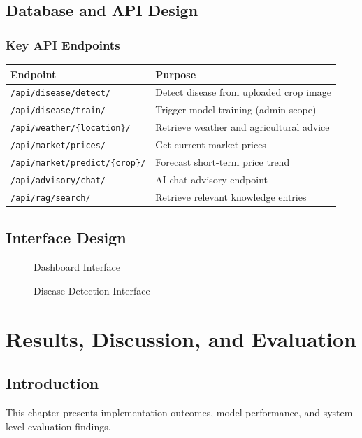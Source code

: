 \documentclass[12pt,a4paper]{report}
\begin{document}
\section{Database and API Design}
\subsection{Key API Endpoints}
\begin{longtable}{p{4.5cm} p{9.5cm}}
\toprule
\textbf{Endpoint} & \textbf{Purpose} \\
\midrule
\texttt{/api/disease/detect/} & Detect disease from uploaded crop image \\
\texttt{/api/disease/train/} & Trigger model training (admin scope) \\
\texttt{/api/weather/\{location\}/} & Retrieve weather and agricultural advice \\
\texttt{/api/market/prices/} & Get current market prices \\
\texttt{/api/market/predict/\{crop\}/} & Forecast short-term price trend \\
\texttt{/api/advisory/chat/} & AI chat advisory endpoint \\
\texttt{/api/rag/search/} & Retrieve relevant knowledge entries \\
\bottomrule
\end{longtable}

\section{Interface Design}
\begin{figure}[H]
    \centering
    \caption{Dashboard Interface}
\end{figure}

\begin{figure}[H]
    \centering
    \caption{Disease Detection Interface}
\end{figure}

\chapter{Results, Discussion, and Evaluation}

\section{Introduction}
This chapter presents implementation outcomes, model performance, and system-level evaluation findings.
\end{document}
